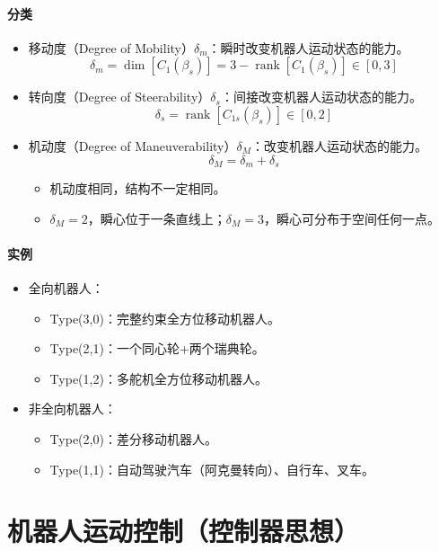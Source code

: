 \documentclass[
12pt, %
a4paper, 
oneside, %
headinclude,footinclude, %
]{scrartcl}
\begin{document}
\paragraph{分类}
\begin{itemize}
\item 移动度（Degree of Mobility）$ \delta_m $：瞬时改变机器人运动状态的能力。
$$ \delta_m = \dim[C_1(\beta_s)] = 3 - \operatorname{rank}[C_1(\beta_s)] \in [0,3] $$
\item 转向度（Degree of Steerability）$ \delta_s $：间接改变机器人运动状态的能力。
$$ \delta_s = \operatorname{rank}[C_{1s}(\beta_s)] \in [0,2] $$
\item 机动度（Degree of Maneuverability）$ \delta_M $：改变机器人运动状态的能力。
$$ \delta_M = \delta_m + \delta_s $$
\begin{itemize}
\item 机动度相同，结构不一定相同。
\item $ \delta_M = 2 $，瞬心位于一条直线上；$ \delta_M = 3 $，瞬心可分布于空间任何一点。
\end{itemize}
\end{itemize}
\paragraph{实例}
\begin{itemize}
\item 全向机器人：
\begin{itemize}
\item Type(3,0)：完整约束全方位移动机器人。
\item Type(2,1)：一个同心轮+两个瑞典轮。
\item Type(1,2)：多舵机全方位移动机器人。
\end{itemize}
\item 非全向机器人：
\begin{itemize}
\item Type(2,0)：差分移动机器人。
\item Type(1,1)：自动驾驶汽车（阿克曼转向）、自行车、叉车。
\end{itemize}
\end{itemize}
\section{机器人运动控制（控制器思想）}
\end{document}
